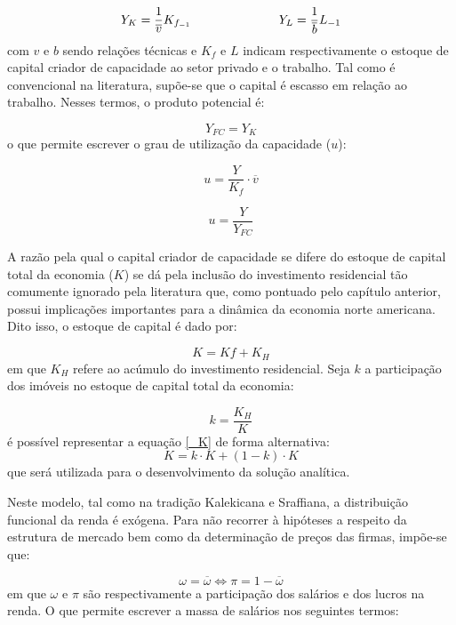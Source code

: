 $$
Y_K = \frac{1}{\overline v}K_{f_{-1}} \hspace{2.5cm} Y_L = \frac{1}{\overline b}L_{-1}
$$
com $v$ e $b$ sendo relações técnicas e $K_f$ e $L$ indicam respectivamente o estoque de capital criador de capacidade ao setor privado e  o trabalho. Tal como é convencional na literatura, supõe-se que o capital é escasso em relação ao trabalho. Nesses termos, o produto potencial é:

\begin{equation}
\label{_YFC}
    Y_{FC} = Y_K
\end{equation}
o que permite escrever o grau de utilização da capacidade ($u$):

$$
u = \frac{Y}{K_f}\cdot \overline v
$$

\begin{equation}
\label{_u}
    u = \frac{Y}{Y_{FC}}
\end{equation}

A razão pela qual o capital criador de capacidade se difere do estoque de capital total da economia ($K$) se dá pela inclusão do investimento residencial tão comumente ignorado pela literatura que, como pontuado pelo capítulo anterior, possui implicações importantes para a dinâmica da economia norte americana. Dito isso, o estoque de capital é dado por:

\begin{equation}
\label{_K}
    K = Kf + K_{H}
\end{equation}
em que $K_H$ refere ao acúmulo do investimento residencial. Seja $k$ a participação dos imóveis no estoque de capital total da economia:

\begin{equation}
\label{_tau}
k = \frac{K_H}{K}    
\end{equation}
é possível representar a equação \ref{_K} de forma alternativa:
$$
K = k\cdot K + (1-k)\cdot K
$$
que será utilizada para o desenvolvimento da solução analítica.

Neste modelo, tal como na tradição Kalekicana e Sraffiana, a distribuição funcional da renda é exógena. Para não recorrer à hipóteses a respeito da estrutura de mercado bem como da determinação de preços das firmas, impõe-se que:

\begin{equation}
    \omega = \overline{\omega} \Leftrightarrow \pi = 1 - \overline{\omega}
\end{equation}
em que $\omega$ e $\pi$ são respectivamente a participação dos salários e dos lucros na renda. O que permite escrever a massa de salários nos seguintes termos:

